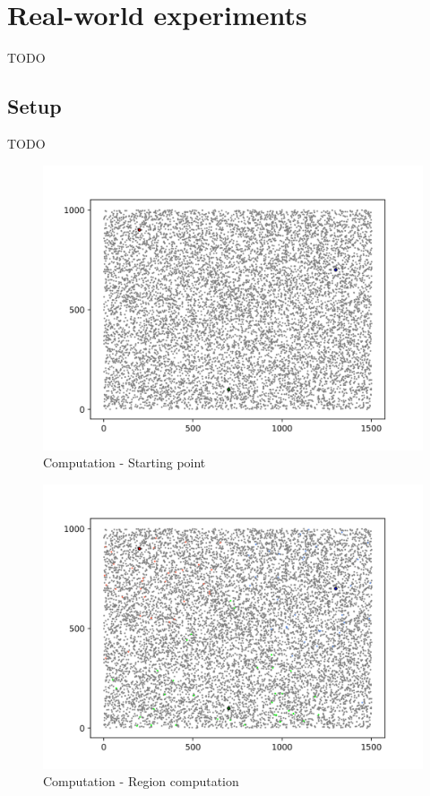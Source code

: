 \section{Real-world experiments}\label{real_world_experiments}
TODO

\subsection{Setup}
TODO

\begin{figure}[!ht]
    \centering
    \includegraphics[width=\linewidth]{document/chapters/chapter_7/images/computation_start.png}
    \caption{Computation - Starting point}
    \label{fig:computation_start}
\end{figure}

\begin{figure}[!ht]
    \centering
    \includegraphics[width=\linewidth]{document/chapters/chapter_7/images/computation_region_computation.png}
    \caption{Computation - Region computation}
    \label{fig:computation_region_computation}
\end{figure}

